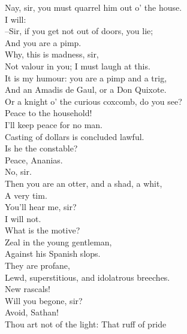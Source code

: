 \documentclass{memoir}
\begin{document}
\begin{drama*}
\facespeaks  Nay, sir, you must quarrel him out o' the house.\\
\kastrilspeaks  I will:\\
 --Sir, if you get not out of doors, you lie;\\
 And you are a pimp.\\
\surlyspeaks {} Why, this is madness, sir,\\
 Not valour in you; I must laugh at this.\\
\kastrilspeaks  It is my humour: you are a pimp and a trig,\\
 And an Amadis de Gaul, or a Don Quixote.\\
\druggerspeaks  Or a knight o' the curious coxcomb, do you see?\\
\ananiasspeaks  Peace to the household!\\
\kastrilspeaks {} I'll keep peace for no man.\\
\ananiasspeaks  Casting of dollars is concluded lawful.\\
\kastrilspeaks  Is he the constable?\\
\subtlespeaks {} Peace, Ananias.\\
\facespeaks  No, sir.\\
\kastrilspeaks {} Then you are an otter, and a shad, a whit,\\
 A very tim.\\
\surlyspeaks {} You'll hear me, sir?\\
\kastrilspeaks {} I will not.\\
\ananiasspeaks  What is the motive?\\
\subtlespeaks {} Zeal in the young gentleman,\\
 Against his Spanish slops.\\
\ananiasspeaks {} They are profane,\\
 Lewd, superstitious, and idolatrous breeches.\\
\surlyspeaks  New rascals!\\
\kastrilspeaks {} Will you begone, sir?\\
\ananiasspeaks {} Avoid, Sathan!\\
 Thou art not of the light: That ruff of pride\\

\end{drama*}
\end{document}
